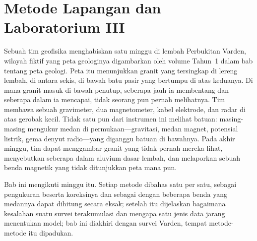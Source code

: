 \chapter{Metode Lapangan dan Laboratorium III}\label{ch:b3:field-lab-methods-3}

Sebuah tim geofisika menghabiskan satu minggu di lembah Perbukitan Varden,
wilayah fiktif yang peta geologinya digambarkan oleh volume Tahun~1 dalam
bab tentang peta geologi. Peta itu menunjukkan granit yang tersingkap di
lereng lembah, di antara sekis, di bawah batu pasir yang
bertumpu di atas keduanya. Di mana granit masuk di bawah penutup, seberapa jauh ia
membentang dan seberapa dalam ia mencapai, tidak seorang pun pernah melihatnya. Tim membawa sebuah
gravimeter, dua magnetometer, kabel elektrode, dan radar di atas
gerobak kecil. Tidak satu pun dari instrumen ini melihat batuan: masing-masing mengukur
medan di permukaan---gravitasi, medan magnet, potensial listrik,
gema denyut radio---yang diganggu batuan di bawahnya.
Pada akhir minggu, tim dapat menggambar granit yang tidak pernah mereka lihat, menyebutkan
seberapa dalam aluvium dasar lembah, dan melaporkan sebuah benda magnetik
yang tidak ditunjukkan peta mana pun.

Bab ini mengikuti minggu itu. Setiap metode dibahas satu per satu, sebagai
pengukuran beserta koreksinya dan sebagai  dengan beberapa
benda yang medannya dapat dihitung secara eksak; setelah itu dijelaskan bagaimana
kesalahan suatu survei terakumulasi dan mengapa satu jenis data jarang menentukan
model; bab ini diakhiri dengan survei Varden, tempat metode-metode itu
dipadukan.

